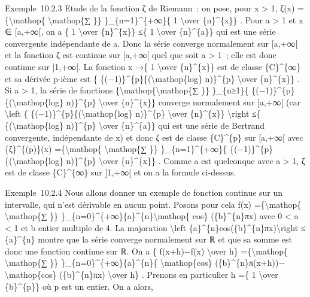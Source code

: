 \documentclass[]{article}
\begin{document}
Exemple~10.2.3 Etude de la fonction ζ de Riemann~: on pose, pour x
\textgreater{} 1, ζ(x) =\{\textbackslash{}mathop\{
\textbackslash{}mathop\{∑ \}\} \}\_\{n=1\}\^{}\{+∞\}\{ 1
\textbackslash{}over \{n\}\^{}\{x\}\} . Pour a \textgreater{} 1 et x ∈
{[}a,+∞{[}, on a \{ 1 \textbackslash{}over \{n\}\^{}\{x\}\} ≤\{ 1
\textbackslash{}over \{n\}\^{}\{a\}\} qui est une série convergente
indépendante de a. Donc la série converge normalement sur {[}a,+∞{[} et
la fonction ζ est continue sur {[}a,+∞{[} quel que soit a \textgreater{}
1~; elle est donc continue sur {]}1,+∞{[}. La fonction x →\{ 1
\textbackslash{}over \{n\}\^{}\{x\}\} est de classe \{C\}\^{}\{∞\} et sa
dérivée p-ième est \{ \{(−1)\}\^{}\{p\}\{(\textbackslash{}mathop\{log\}
n)\}\^{}\{p\} \textbackslash{}over \{n\}\^{}\{x\}\} . Si a
\textgreater{} 1, la série de fonctions
\{\textbackslash{}mathop\{\textbackslash{}mathop\{∑ \}\} \}\_\{n≥1\}\{
\{(−1)\}\^{}\{p\}\{(\textbackslash{}mathop\{log\} n)\}\^{}\{p\}
\textbackslash{}over \{n\}\^{}\{x\}\} converge normalement sur
{[}a,+∞{[} (car \textbackslash{}left \textbar{}\{
\{(−1)\}\^{}\{p\}\{(\textbackslash{}mathop\{log\} n)\}\^{}\{p\}
\textbackslash{}over \{n\}\^{}\{x\}\} \textbackslash{}right
\textbar{}≤\{ \{(\textbackslash{}mathop\{log\} n)\}\^{}\{p\}
\textbackslash{}over \{n\}\^{}\{a\}\} qui est une série de Bertrand
convergente, indépendante de x) et donc ζ est de classe \{C\}\^{}\{p\}
sur {[}a,+∞{[} avec \{ζ\}\^{}\{(p)\}(x) =\{\textbackslash{}mathop\{
\textbackslash{}mathop\{∑ \}\} \}\_\{n=1\}\^{}\{+∞\}\{
\{(−1)\}\^{}\{p\}\{(\textbackslash{}mathop\{log\} n)\}\^{}\{p\}
\textbackslash{}over \{n\}\^{}\{x\}\} . Comme a est quelconque avec a
\textgreater{} 1, ζ est de classe \{C\}\^{}\{∞\} sur {]}1,+∞{[} et on a
la formule ci-dessus.

Exemple~10.2.4 Nous allons donner un exemple de fonction continue sur un
intervalle, qui n'est dérivable en aucun point. Posons pour cela f(x)
=\{\textbackslash{}mathop\{ \textbackslash{}mathop\{∑ \}\}
\}\_\{n=0\}\^{}\{+∞\}\{a\}\^{}\{n\}\textbackslash{}mathop\{ cos\}
(\{b\}\^{}\{n\}πx) avec 0 \textless{} a \textless{} 1 et b entier
multiple de 4. La majoration \textbackslash{}left
\textbar{}\{a\}\^{}\{n\}cos(\{b\}\^{}\{n\}πx)\textbackslash{}right
\textbar{} ≤ \{a\}\^{}\{n\} montre que la série converge normalement sur
ℝ et que sa somme est donc une fonction continue sur ℝ. On a \{
f(x+h)−f(x) \textbackslash{}over h\} =\{\textbackslash{}mathop\{
\textbackslash{}mathop\{∑ \}\} \}\_\{n=0\}\^{}\{+∞\}\{a\}\^{}\{n\}\{
\textbackslash{}mathop\{cos\}
(\{b\}\^{}\{n\}π(x+h))−\textbackslash{}mathop\{cos\} (\{b\}\^{}\{n\}πx)
\textbackslash{}over h\} . Prenons en particulier h =\{ 1
\textbackslash{}over \{b\}\^{}\{p\}\} où p est un entier. On a alors,
\end{document}
